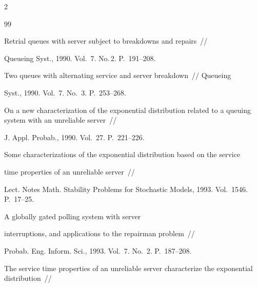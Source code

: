 \begin{multicols}{2}
{{\begin{thebibliography}{99}




Retrial queues with server subject to breakdowns and repairs~//


Queueing Syst., 1990. Vol.~7. No.\,2. P.~191--208.









Two queues with alternating service and server breakdown~// Queueing


Syst., 1990. Vol.~7. No.~3. P.~253--268.









On a new characterization of the exponential distribution related to a queuing system with an unreliable server~//


J. Appl. Probab., 1990. Vol.~27. P.~221--226.









Some characterizations of the exponential distribution based on the service


time properties of an unreliable server~//


Lect. Notes Math. Stability Problems for Stochastic Models, 1993. Vol.~1546. P.~17--25.









A globally gated polling system with server


interruptions, and applications to the repairman problem~//


 Probab. Eng. Inform. Sci., 1993. Vol.~7. No.~2. P.~187--208.









The service time properties of an unreliable server characterize the exponential distribution~//



\end{thebibliography}}}
\end{multicols}
